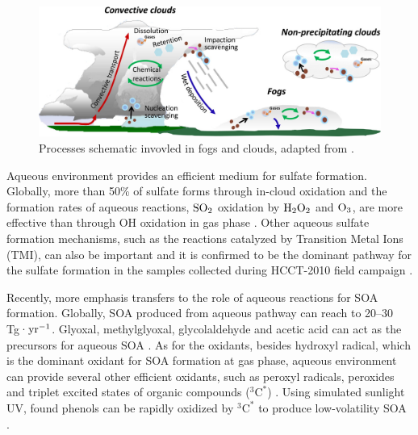 \documentclass[edeposit,fullpage]{uiucthesis2009}
\begin{document}
\begin{figure}
	\centering
	\includegraphics[scale=1.0]{chap1_figs/thesis_chap1_fig4.jpeg}
	\caption{Processes schematic invovled in fogs and clouds, adapted from \cite{ervens2015modeling}.}
	\label{fig:chap1-aq-proc}
\end{figure}

Aqueous environment provides an efficient medium for sulfate formation. Globally, more than 50\% of sulfate forms through in-cloud oxidation and the formation rates of aqueous reactions, $\rm SO_2$ oxidation by $\rm H_2O_2$ and $\rm O_3$, are more effective than through OH oxidation in gas phase \citep{kreidenweis2003modification, rasch2000description}. Other aqueous sulfate formation mechanisms, such as the reactions catalyzed by Transition Metal Ions (TMI), can also be important and it is confirmed to be the dominant pathway for the sulfate formation in the samples collected during HCCT-2010 field campaign \citep{harris2012sulfur, harris2013enhanced}. 

Recently, more emphasis transfers to the role of aqueous reactions for SOA formation. Globally, SOA produced from aqueous pathway can reach to 20--30 Tg·$\rm yr^{-1}$. Glyoxal, methylglyoxal, glycolaldehyde and acetic acid can act as the precursors for aqueous SOA \citep{liu2012global}. As for the oxidants, besides hydroxyl radical, which is the dominant oxidant for SOA formation at gas phase, aqueous environment can provide several other efficient oxidants, such as peroxyl radicals, peroxides and triplet excited states of organic compounds ($^{3}\textrm{C}^*$) \citep{mcneill2015aqueous, ervens2011secondary}. Using simulated sunlight UV, \citet{smith2014secondary} found phenols can be rapidly oxidized by $^{3}\textrm{C}^*$ to produce low-volatility SOA . 
\end{document}
